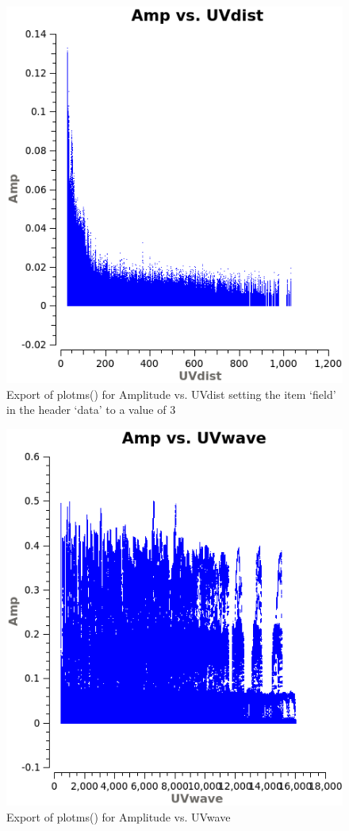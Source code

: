 \documentclass[12pt, a4paper]{article}
\begin{document}
\begin{figure}[h!]
    \centering
    \includegraphics[scale=0.65]{../Imaging/plots/Ampltide_vs_UVdist_data-field-3_vraag14-5.png}
    \caption{Export of plotms() for Amplitude vs. UVdist setting the item `field' in the header `data' to a value of 3 \label{fig:14-5}}
\end{figure}

\begin{figure}[h!]
    \centering
    \includegraphics[scale=0.65]{../Imaging/plots/Ampltide_vs_UVwave_vraag14-6.png}
    \caption{Export of plotms() for Amplitude vs. UVwave \label{fig:14-6}}
\end{figure}
\end{document}
